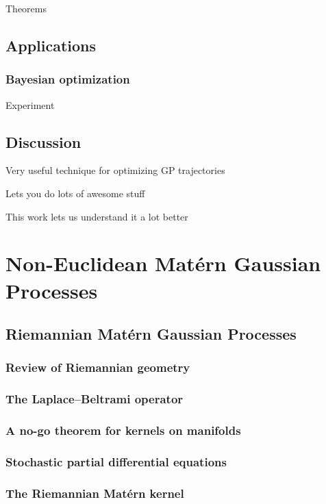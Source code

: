 \documentclass[11pt]{book}
\begin{document}
Theorems

\section{Applications}

\subsection{Bayesian optimization}

Experiment

\section{Discussion}

Very useful technique for optimizing GP trajectories

Lets you do lots of awesome stuff

This work lets us understand it a lot better





\chapter{Non-Euclidean Matérn Gaussian Processes}
\label{ch:noneuclidean}

\section{Riemannian Matérn Gaussian Processes}

\subsection{Review of Riemannian geometry}
\subsection{The Laplace--Beltrami operator}
\subsection{A no-go theorem for kernels on manifolds}
\subsection{Stochastic partial differential equations}
\subsection{The Riemannian Matérn kernel}
\end{document}
